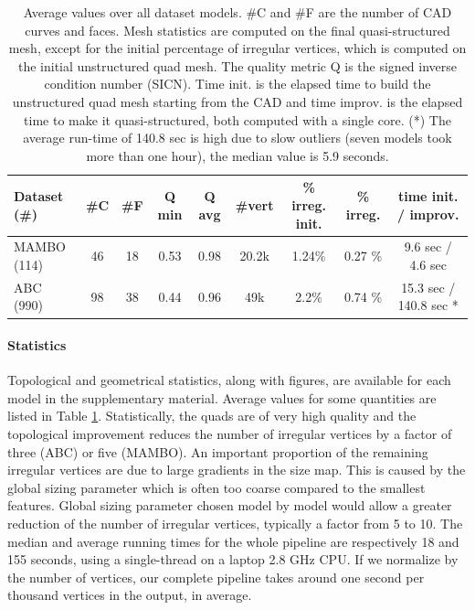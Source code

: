 \documentclass[AMA,STIX1COL]{WileyNJD-v2}
\begin{document}
{\begin{table}
\begin{center}
    \begin{tabular}{ | l | c | c | c | c | c | c | c | c |}
    \hline
    Dataset (\#)  & \#C & \#F  & Q min & Q avg & \#vert & \% irreg. init.         & \% irreg. & time init. / improv. \\ \hline
    MAMBO (114) &    46   &  18    &    0.53    &  0.98  & 20.2k & 1.24\% & 0.27 \% & 9.6 sec / 4.6 sec \\ \hline
    ABC (990) &    98   &  38    &    0.44    &  0.96  & 49k & 2.2\% & 0.74 \%   & 15.3 sec / 140.8 sec * \\ \hline
    \end{tabular}
\end{center}
    \caption{Average values over all dataset models. 
        \#C and \#F are the number of CAD curves and faces.
        Mesh statistics are
        computed on the final quasi-structured mesh, except
        for the initial percentage of irregular vertices, which is
        computed on the initial unstructured quad mesh. The
    quality metric Q is the signed inverse condition number (SICN).
Time init. is the elapsed time to build the unstructured quad mesh starting
from the CAD and time improv. is the elapsed time to make it quasi-structured,
both computed with a single core. (*) The average run-time of 140.8 sec is high due to slow
outliers (seven models took more than one hour), the median value is 5.9 seconds.}
    \label{table:results}
\end{table}


\paragraph{Statistics} Topological and geometrical statistics, along with
figures, are available for each model in the supplementary material. Average
values for some quantities are listed in Table \ref{table:results}.
Statistically, the quads are of very high quality and the topological
improvement reduces the number of irregular vertices by a factor
of three (ABC) or five (MAMBO). An important proportion of the remaining irregular vertices are due to 
large gradients in the size map. This
is caused by the global sizing parameter which is often too coarse compared
to the smallest features.
Global sizing parameter chosen model by model would allow a greater
reduction of the number of irregular vertices, typically a factor from 5 to 10.
The median and average running times for the whole pipeline are respectively 18
and 155 seconds, using a single-thread on a laptop 2.8 GHz CPU.
If we normalize by the number of vertices, our complete pipeline takes around
one second per thousand vertices in the output, in average.


}
\end{document}
